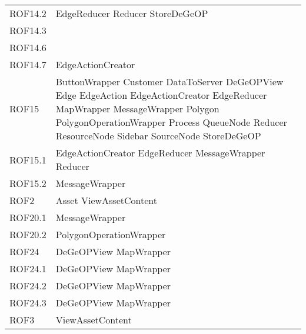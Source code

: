 \begin{longtable}{p{2.5cm}!{\VRule[1pt]}p{5cm}}
	ROF14.2 & EdgeReducer \newline Reducer \newline StoreDeGeOP\\
	ROF14.3 & \\
	ROF14.6 & \\
	ROF14.7 & EdgeActionCreator\\
	ROF15 & ButtonWrapper \newline Customer \newline DataToServer \newline DeGeOPView \newline Edge \newline EdgeAction \newline EdgeActionCreator \newline EdgeReducer \newline MapWrapper \newline MessageWrapper \newline Polygon \newline PolygonOperationWrapper \newline Process \newline QueueNode \newline Reducer \newline ResourceNode \newline Sidebar \newline SourceNode \newline StoreDeGeOP\\
	ROF15.1 & EdgeActionCreator \newline EdgeReducer \newline MessageWrapper \newline Reducer\\
	ROF15.2 & MessageWrapper\\
	ROF2 & Asset \newline ViewAssetContent\\
	ROF20.1 & MessageWrapper\\
	ROF20.2 & PolygonOperationWrapper\\
	ROF24 & DeGeOPView \newline MapWrapper\\
	ROF24.1 & DeGeOPView \newline MapWrapper\\
	ROF24.2 & DeGeOPView \newline MapWrapper\\
	ROF24.3 & DeGeOPView \newline MapWrapper\\
	ROF3 & ViewAssetContent\\

\end{longtable}
